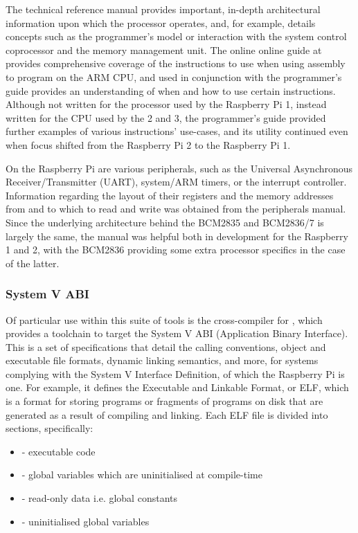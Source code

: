         The technical reference manual provides important, in-depth
        architectural information upon which the processor operates, and, for
        example, details concepts such as the programmer's model or interaction
        with the system control coprocessor and the memory management unit. The
        online online guide at \cite{OnlineARMGuide} provides comprehensive
        coverage of the instructions to use when using assembly to program on
        the ARM CPU, and used in conjunction with the programmer's guide
        provides an understanding of when and how to use certain instructions.
        Although not written for the processor used by the Raspberry Pi 1,
        instead written for the CPU used by the 2 and 3, the programmer's guide
        provided further examples of various instructions' use-cases, and its
        utility continued even when focus shifted from the Raspberry Pi 2 to the
        Raspberry Pi 1.

        On the Raspberry Pi are various peripherals, such as the Universal
        Asynchronous Receiver/Transmitter (UART), system/ARM timers, or the
        interrupt controller. Information regarding the layout of their
        registers and the memory addresses from and to which to read and write
        was obtained from the peripherals manual. Since the underlying
        architecture behind the BCM2835 and BCM2836/7 is largely the same, the
        manual was helpful both in development for the Raspberry 1 and 2,
        with the BCM2836 \cite{BCM2836} providing some extra processor specifics
        in the case of the latter.

    \subsubsection{System V ABI}
        Of particular use within this suite of tools is the cross-compiler for
        , which provides a toolchain to target the System V
        ABI (Application Binary Interface). This is a set of specifications that
        detail the calling conventions, object and executable file formats,
        dynamic linking semantics, and more, for systems complying with the
        System V Interface Definition, of which the Raspberry Pi is one. For
        example, it defines the Executable and Linkable Format, or ELF, which is
        a format for storing programs or fragments of programs on disk that are
        generated as a result of compiling and linking. Each ELF file is divided
        into sections, specifically:
        \begin{itemize}
            \itemsep0em
            \item {} - executable code
            \item {} - global variables which are uninitialised at
                compile-time
            \item {} - read-only data i.e. global constants
            \item {} - uninitialised global variables
        \end{itemize}

